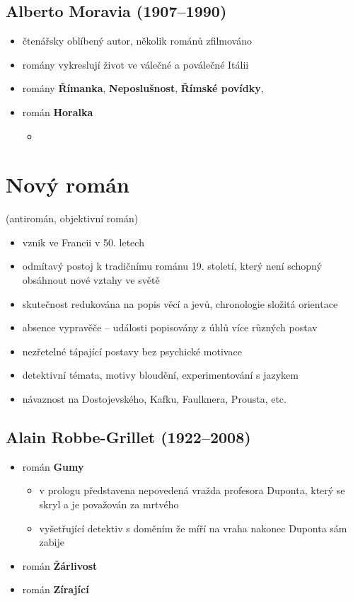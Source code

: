 \subsection{Alberto Moravia (1907--1990)}
\begin{itemize}
\item čtenářsky oblíbený autor, několik románů zfilmováno
\item romány vykreslují život ve válečné a poválečné Itálii
\item romány \textbf{Římanka}, \textbf{Neposlušnost}, \textbf{Římské povídky},
\item román \textbf{Horalka}
	\begin{itemize}
	\item 
	\end{itemize}
\end{itemize}



\section{Nový román} (antiromán, objektivní román)
\begin{itemize}
\item vznik ve Francii v 50. letech 
\item odmítavý postoj k tradičnímu románu 19. století, který není schopný obsáhnout nové vztahy ve světě
\item skutečnost redukována na popis věcí a jevů, chronologie \ra složitá orientace
\item absence vypravěče -- události popisovány z úhlů více různých postav
\item nezřetelné tápající postavy bez psychické motivace
\item detektivní témata, motivy bloudění, experimentování s jazykem
\item návaznost na Dostojevského, Kafku, Faulknera, Prousta, etc.
\end{itemize}

\subsection{Alain Robbe-Grillet (1922--2008)}
\begin{itemize}
\item román \textbf{Gumy}
	\begin{itemize}
	\item v prologu představena nepovedená vražda profesora Duponta, který se skryl a je považován za mrtvého
	\item vyšetřující detektiv s doměním že míří na vraha nakonec Duponta sám zabije
	\end{itemize}
\item román \textbf{Žárlivost}
\item román \textbf{Zírající}
\end{itemize}

